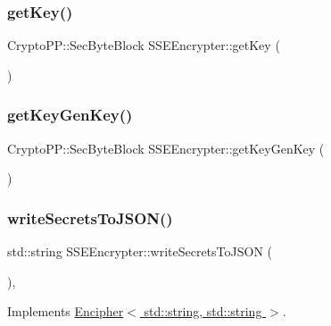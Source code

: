 \mbox{\label{classSSEEncrypter_ae9562054f00a5f9899b019568cad2338}} 
\subsubsection{\texorpdfstring{get\+Key()}{getKey()}}
{\footnotesize\ttfamily Crypto\+P\+P\+::\+Sec\+Byte\+Block S\+S\+E\+Encrypter\+::get\+Key (\begin{DoxyParamCaption}{ }\end{DoxyParamCaption})}

\mbox{\label{classSSEEncrypter_a0fa90c40369bc916f61e870fd39a42c2}} 
\subsubsection{\texorpdfstring{get\+Key\+Gen\+Key()}{getKeyGenKey()}}
{\footnotesize\ttfamily Crypto\+P\+P\+::\+Sec\+Byte\+Block S\+S\+E\+Encrypter\+::get\+Key\+Gen\+Key (\begin{DoxyParamCaption}{ }\end{DoxyParamCaption})}

\mbox{\label{classSSEEncrypter_a70e01b58fe0de0931cdb00ee97ee4af9}} 
\subsubsection{\texorpdfstring{write\+Secrets\+To\+J\+S\+O\+N()}{writeSecretsToJSON()}}
{\footnotesize\ttfamily std\+::string S\+S\+E\+Encrypter\+::write\+Secrets\+To\+J\+S\+ON (\begin{DoxyParamCaption}{ }\end{DoxyParamCaption})\hspace{0.3cm}{\ttfamily [override]}, {\ttfamily [virtual]}}



Implements \hyperlink{classEncipher_a27d3efa1e364c1f0d7def65454c61b85}{Encipher$<$ std\+::string, std\+::string $>$}.



